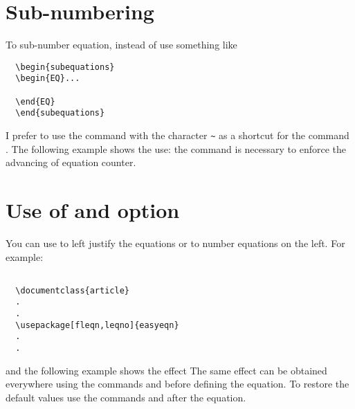 \documentclass[a4paper,final,11pt]{article}
\begin{document}
\section{Sub-numbering}
To sub-number equation, instead of use something like
\begin{verbatim}
  \begin{subequations}
  \begin{EQ}...
    
  \end{EQ}
  \end{subequations}
\end{verbatim}
I prefer to use the  command with the character \verb'~'
as a shortcut for the command . The following example shows 
the use:
the  command is necessary to enforce the advancing of 
equation counter.


\section{Use of  and  option}
You can use  to left justify the equations or
 to number equations on the left.
For example:
\begin{verbatim}

  \documentclass{article}
  .
  .
  \usepackage[fleqn,leqno]{easyeqn}
  .
  .

\end{verbatim}
and the following example shows the effect
\equationleft\numberleft 
{}
\equationcenter\numberright
%
The same effect can be obtained everywhere using the commands
 and  before defining
the equation. To restore the default values use the commands
 and  after the equation.
%
\end{document}
